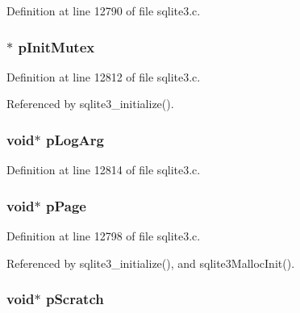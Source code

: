 Definition at line 12790 of file sqlite3.\+c.

\hypertarget{struct_sqlite3_config_a2739bff623111fe6e200c987e10378c9}{}
\subsubsection[{p\+Init\+Mutex}]{$\ast$ p\+Init\+Mutex}\label{struct_sqlite3_config_a2739bff623111fe6e200c987e10378c9}


Definition at line 12812 of file sqlite3.\+c.



Referenced by sqlite3\+\_\+initialize().

\hypertarget{struct_sqlite3_config_ad86c50ffe8e4c213307b5f89c582d743}{}
\subsubsection[{p\+Log\+Arg}]{\setlength{\rightskip}{0pt plus 5cm}void$\ast$ p\+Log\+Arg}\label{struct_sqlite3_config_ad86c50ffe8e4c213307b5f89c582d743}


Definition at line 12814 of file sqlite3.\+c.

\hypertarget{struct_sqlite3_config_a192685931829ee40cbef934bf644c7ce}{}
\subsubsection[{p\+Page}]{\setlength{\rightskip}{0pt plus 5cm}void$\ast$ p\+Page}\label{struct_sqlite3_config_a192685931829ee40cbef934bf644c7ce}


Definition at line 12798 of file sqlite3.\+c.



Referenced by sqlite3\+\_\+initialize(), and sqlite3\+Malloc\+Init().

\hypertarget{struct_sqlite3_config_a5816c3e492705243db472d471eedf71c}{}
\subsubsection[{p\+Scratch}]{\setlength{\rightskip}{0pt plus 5cm}void$\ast$ p\+Scratch}\label{struct_sqlite3_config_a5816c3e492705243db472d471eedf71c}


